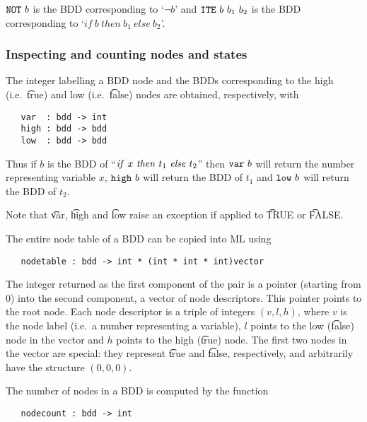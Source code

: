 $\mbox{\tt NOT}~b$ is the BDD corresponding to  `$\neg b$' and $\mbox{\tt ITE}~b~b_1~b_2$ is the BDD corresponding
to `$if~b~then~b_1~else~b_2$'.




\subsubsection{Inspecting and counting nodes and states}

The integer labelling a BDD node and the BDDs corresponding to the high
(i.e.~{\t{true}}) and low (i.e.~{\t{false}}) nodes are obtained,
respectively, with

\begin{verbatim}
   var  : bdd -> int
   high : bdd -> bdd
   low  : bdd -> bdd
\end{verbatim}

Thus if $b$ is the BDD of ``${\it{if}}~x~{\it{then}}~t_1~{\it{else}}~t_2$''
then $\mbox{\tt var}~b$ will return the number representing variable $x$,
$\mbox{\tt high}~b$ will return the BDD of $t_1$ and $\mbox{\tt low}~b$ will return
the BDD of $t_2$.

Note that \t{var}, \t{high} and \t{low} raise an exception if applied
to \t{TRUE} or \t{FALSE}.

The entire \Buddy{} node table of a BDD can be copied into ML using

\begin{verbatim}
   nodetable : bdd -> int * (int * int * int)vector
\end{verbatim}

The integer returned as the first component of the pair is a pointer
(starting from 0) into the second component, a vector of node
descriptors. This pointer points to the root node. Each node
descriptor is a triple of integers $(v,l,h)$, where $v$ is the node
label (i.e.~a number representing a variable), $l$ points to the low
({\t{false}}) node in the vector and $h$ points to the high
({\t{true}}) node. The first two nodes in the vector are special:
they represent {\t{true}} and {\t{false}}, respectively, and arbitrarily have
the structure $(0,0,0)$.

The number of nodes in a BDD is computed by the function

\begin{verbatim}
   nodecount : bdd -> int
\end{verbatim}

